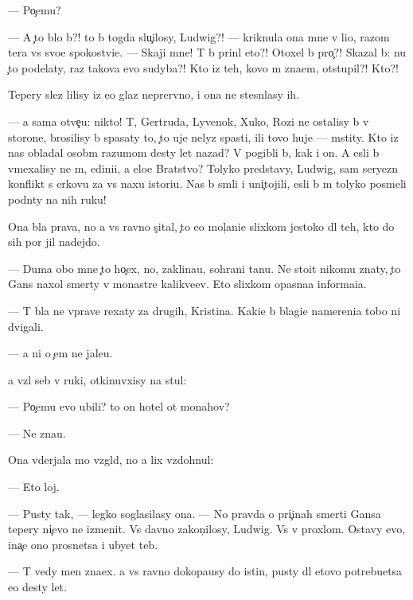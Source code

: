 \documentclass[10pt]{book}
\begin{document}
— Po{\c}emu?

— A {\c}to b{\yi}lo b{\yi}?! {\C}to b{\yi} togda slu{\c}ilosy, Ludwig?! — kriknula ona mne v li{\q}o, razom ter{\ia}{\y}a vs{\e} svo{\y}e spoko{\y}stvi{\y}e. — Skaji mne! T{\yi} b{\yi} prin{\ia}l eto?! Otoxel b{\yi} pro{\c}?! Skazal b{\yi}: nu {\c}to podelaty, raz takova {\y}evo sudyba?! Kto iz teh, kovo m{\yi} zna{\y}em, otstupil?! Kto?!

Tepery slez{\yi} lilisy iz {\y}e{\y}o glaz neprer{\yi}vno, i ona ne stesn{\ia}lasy ih.

— {\Y}a sama otve{\c}u: nikto! T{\yi}, Gertruda, Lyvenok, Xuko, Rozi ne ostalisy b{\yi} v storone, brosilisy b{\yi} spasaty to, {\c}to uje nelyz{\ia} spasti, ili tovo huje — mstity. Kto iz nas obladal osob{\yi}m razumom des{\ia}ty let nazad? V{\yi} pogibli b{\yi}, kak i on. A {\y}esli b{\yi} vmexalisy ne m{\yi}, {\y}edini{\q}i, a {\q}elo{\y}e Bratstvo? Tolyko predstavy, Ludwig, sam{\yi}{\y} seryezn{\yi}{\y} konflikt s {\Q}erkov{\y}u za vs{\iu} naxu istori{\y}u. Nas b{\yi} sm{\ia}li i uni{\c}tojili, {\y}esli b{\yi} m{\yi} tolyko posmeli podn{\ia}ty na nih ruku!

Ona b{\yi}la prava, no {\y}a vs{\e} ravno s{\c}ital, {\c}to {\y}e{\y}o mol{\c}ani{\y}e slixkom jestoko dl{\ia} teh, kto do sih por jil nadejdo{\y}.

— Duma{\y} obo mne {\c}to ho{\c}ex, no, zaklina{\y}u, sohrani ta{\y}nu. Ne sto{\y}it nikomu znaty, {\c}to Gans naxol smerty v monast{\yi}re kalikve{\q}ev. Eto slixkom opasna{\y}a informa{\q}i{\y}a.

— T{\yi} b{\yi}la ne vprave rexaty za drugih, Kristina. Kaki{\y}e b{\yi} blagi{\y}e namereni{\y}a tobo{\y} ni dvigali.

— {\Y}a ni o {\c}em ne jale{\y}u.

{\Y}a vz{\ia}l seb{\ia} v ruki, otkinuvxisy na stul:

— Po{\c}emu {\y}evo ubili? {\C}to on hotel ot monahov?

— Ne zna{\y}u.

Ona v{\yi}derjala mo{\y} vzgl{\ia}d, no {\y}a lix vzdohnul:

— Eto loj.

— Pusty tak, — legko soglasilasy ona. — No pravda o pri{\c}inah smerti Gansa tepery ni{\c}evo ne izmenit. Vs{\e} davno zakon{\c}ilosy, Ludwig. Vs{\e} v proxlom. Ostavy {\y}evo, ina{\c}e ono prosnetsa i ubyet teb{\ia}.

— T{\yi} vedy men{\ia} zna{\y}ex. {\Y}a vs{\e} ravno dokopa{\y}usy do istin{\yi}, pusty dl{\ia} etovo potrebu{\y}etsa {\y}e{\x}o des{\ia}ty let.
\end{document}
